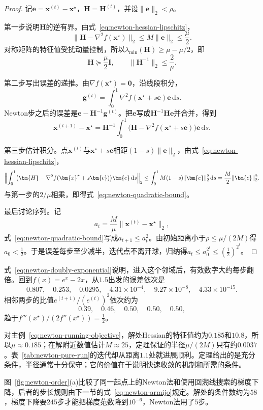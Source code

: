 \begin{proof}
记$\bm{e}=\bm{x}^{(t)}-\bm{x}^\star$，$\bm{H}=\bm{H}^{(t)}$，并设$\lVert\bm{e}\rVert_2<\rho$。

第一步说明$\bm{H}$的逆有界。由式~\eqref{eq:newton-hessian-lipschitz}，
\[
 \lVert\bm{H}-\nabla^2f(\bm{x}^\star)\rVert_2\leq M\lVert\bm{e}\rVert_2\leq\frac\mu2.
\]
对称矩阵的特征值受扰动量控制，所以$\lambda_{\min}(\bm{H})\geq\mu-\mu/2$，即
\[
 \bm{H}\succeq\frac\mu2\bm{I},\qquad \lVert\bm{H}^{-1}\rVert_2\leq\frac2\mu.
\]

第二步写出误差的递推。由$\nabla f(\bm{x}^\star)=\bm{0}$，沿线段积分，
\[
 \bm{g}^{(t)}=\int_0^1\nabla^2f(\bm{x}^\star+s\bm{e})\bm{e}\,\mathrm{d}s.
\]
Newton步之后的误差是$\bm{e}-\bm{H}^{-1}\bm{g}^{(t)}$。把$\bm{e}$写成$\bm{H}^{-1}\bm{H}\bm{e}$并合并，得到
\[
 \bm{x}^{(t+1)}-\bm{x}^\star=\bm{H}^{-1}\int_0^1\bigl(\bm{H}-\nabla^2f(\bm{x}^\star+s\bm{e})\bigr)\bm{e}\,\mathrm{d}s.
\]

第三步估计积分。点$\bm{x}^{(t)}$与$\bm{x}^\star+s\bm{e}$相距$(1-s)\lVert\bm{e}\rVert_2$，由式~\eqref{eq:newton-hessian-lipschitz}，
\[
 \Bigl\lVert\int_0^1\bigl(\bm{H}-\nabla^2f(\bm{x}^\star+s\bm{e})\bigr)\bm{e}\,\mathrm{d}s\Bigr\rVert_2
 \leq\int_0^1M(1-s)\lVert\bm{e}\rVert_2^2\,\mathrm{d}s=\frac M2\lVert\bm{e}\rVert_2^2.
\]
与第一步的$2/\mu$相乘，即得式~\eqref{eq:newton-quadratic-bound}。

最后讨论序列。记
\[
 a_t=\frac M\mu\lVert\bm{x}^{(t)}-\bm{x}^\star\rVert_2,
\]
式~\eqref{eq:newton-quadratic-bound}写成$a_{t+1}\leq a_t^2$。由初始距离小于$\rho\leq\mu/(2M)$得$a_0<\tfrac12$。于是误差每步至少减半，迭代点不离开球，归纳得$a_t\leq a_0^{2^t}\leq(\tfrac12)^{2^t}$。
\end{proof}

式~\eqref{eq:newton-doubly-exponential}说明，进入这个邻域后，有效数字大约每步翻倍。回到$f(x)=e^x-2x$，从$1.5$出发的误差依次是
\[
 0.807,\quad 0.253,\quad 0.0295,\quad 4.31\times10^{-4},\quad 9.27\times10^{-8},\quad 4.33\times10^{-15}.
\]
相邻两步的比值$e^{(t+1)}/(e^{(t)})^2$依次约为
\[
 0.39,\quad 0.46,\quad 0.50,\quad 0.50,\quad 0.50,
\]
趋于$f'''(x^\star)/(2f''(x^\star))=\tfrac12$。

对主例~\eqref{eq:newton-running-objective}，解处Hessian的特征值约为$0.185$和$10.8$，所以$\mu\approx0.185$；在解附近数值估计$M\approx25$，定理保证的半径$\mu/(2M)$只有约$0.0037$。表~\ref{tab:newton-pure-run}的迭代却从距离$1.1$处就进展顺利。定理给出的是充分条件，半径通常十分保守；它的价值在于说明快速收敛的机制和所需的条件。

图~\ref{fig:newton-order}(a)比较了同一起点上的Newton法和使用回溯线搜索的梯度下降，后者的步长规则由下一节的式~\eqref{eq:newton-armijo}规定。解处的条件数约为$58$，梯度下降要$245$步才能把梯度范数降到$10^{-6}$，Newton法用了$5$步。

